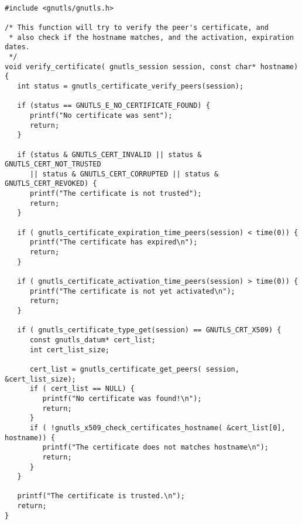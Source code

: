\label{ex:rfc2818}

\begin{verbatim}

#include <gnutls/gnutls.h>

/* This function will try to verify the peer's certificate, and
 * also check if the hostname matches, and the activation, expiration dates.
 */
void verify_certificate( gnutls_session session, const char* hostname)
{
   int status = gnutls_certificate_verify_peers(session);

   if (status == GNUTLS_E_NO_CERTIFICATE_FOUND) {
      printf("No certificate was sent");
      return;
   }

   if (status & GNUTLS_CERT_INVALID || status & GNUTLS_CERT_NOT_TRUSTED
      || status & GNUTLS_CERT_CORRUPTED || status & GNUTLS_CERT_REVOKED) {
      printf("The certificate is not trusted");
      return;
   }

   if ( gnutls_certificate_expiration_time_peers(session) < time(0)) {
      printf("The certificate has expired\n");
      return;
   }

   if ( gnutls_certificate_activation_time_peers(session) > time(0)) {
      printf("The certificate is not yet activated\n");
      return;
   }

   if ( gnutls_certificate_type_get(session) == GNUTLS_CRT_X509) {
      const gnutls_datum* cert_list;
      int cert_list_size;
      
      cert_list = gnutls_certificate_get_peers( session, &cert_list_size);
      if ( cert_list == NULL) {
         printf("No certificate was found!\n");
         return;
      }
      if ( !gnutls_x509_check_certificates_hostname( &cert_list[0], hostname)) {
         printf("The certificate does not matches hostname\n");
         return;
      }
   }
   
   printf("The certificate is trusted.\n");
   return;
}

\end{verbatim}
